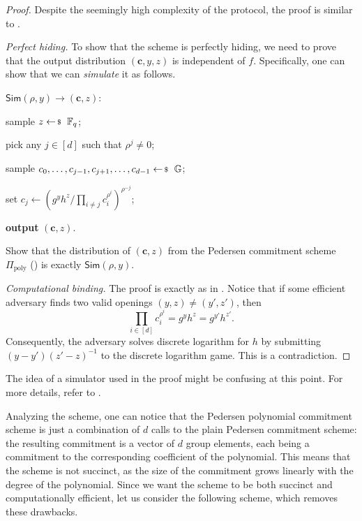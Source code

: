 \documentclass[../../book]{subfiles}
\begin{document}
\begin{proof}
    Despite the seemingly high complexity of the protocol, the proof is similar to .

    \textit{Perfect hiding.} To show that the scheme is perfectly hiding, we need to prove that the output distribution $(\mathbf{c},y,z)$ is independent of $f$.
    Specifically, one can show that we can \emph{simulate} it as follows.

    \underline{$\mathsf{Sim}(\rho,y) \to (\mathbf{c},z):$}
    \begin{algoen}
        \item sample $z \leftarrowS \mathbb{F}_q$;
        \item pick any $j \in [d]$ such that $\rho^j \neq 0$;
        \item sample $c_0,\dots,c_{j-1},c_{j+1},\dots,c_{d-1} \leftarrowS \mathbb{G}$;
        \item set $c_j \gets \left(g^yh^z/\prod_{i \neq j}c_i^{\rho^i}\right)^{\rho^{-j}}$;
        \item \textbf{output} $(\mathbf{c},z)$.
    \end{algoen}

    \begin{exercise}
        Show that the distribution of $(\mathbf{c},z)$ from the Pedersen commitment scheme $\Pi_{\text{poly}}$ () is exactly $\mathsf{Sim}(\rho,y)$.
    \end{exercise}

    \textit{Computational binding.} The proof is exactly as in .
    Notice that if some efficient adversary finds two valid openings $(y,z) \neq (y',z')$, then 
    \begin{equation*}
        \prod_{i \in [d]} c_i^{\rho^i} = g^yh^z = g^{y'}h^{z'}.
    \end{equation*}
    Consequently, the adversary solves discrete logarithm for $h$ by submitting $(y-y')(z'-z)^{-1}$ to the discrete logarithm game.
    This is a contradiction.
\end{proof}

\begin{remark}
    The idea of a simulator used in the proof might be confusing at this point.
    For more details, refer to .
\end{remark}

Analyzing the scheme, one can notice that the Pedersen polynomial commitment scheme is just a combination of $d$ calls to the plain Pedersen commitment scheme: the resulting commitment is a vector of $d$ group elements, each being a commitment to the corresponding coefficient of the polynomial. This means that the scheme is not succinct, as the size of the commitment grows linearly with the degree of the polynomial. Since we want the scheme to be both succinct and computationally efficient, let us consider the following scheme, which removes these drawbacks.
\end{document}
